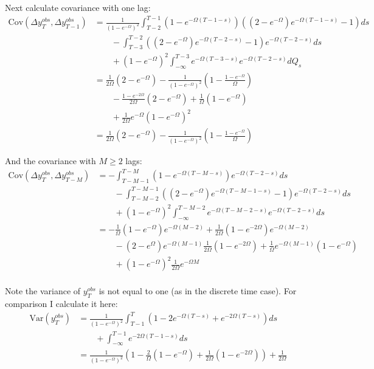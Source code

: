 \documentclass[12pt,pdftex,letterpaper]{article}
\begin{document}
Next calculate covariance with one lag:
\begin{align*}
\mathrm{Cov}(\Delta y_T^{obs},\Delta y_{T-1}^{obs}) 
&=\frac{1}{(1-e^{-\Omega})^2}\int_{T-2}^{T-1}  ( 1 - e^{-\Omega (T-1-s)} ) \left( (2-e^{-\Omega}) e^{-\Omega (T-1-s)} -1  \right) ds \\
 & \qquad - \int_{T-3}^{T-2}\left( (2-e^{-\Omega}) e^{-\Omega (T-2-s)} -1  \right) e^{-\Omega (T-2-s)} ds \\
& \qquad +  (1-e^{-\Omega})^2 \int_{-\infty}^{T-3}  e^{-\Omega (T-3-s)}  e^{-\Omega (T-2-s)} dQ_s \\
&=   \frac{1}{2\Omega}(2-e^{-\Omega}) - \frac{1}{(1-e^{-\Omega})^2}( 1 - \frac{1-e^{-\Omega}}{\Omega}) \\
& \qquad - \frac{1-e^{-2\Omega}}{2\Omega}\left( 2- e^{-\Omega} \right) + \frac{1}{\Omega}(1-e^{-\Omega}) \\
& \qquad +  \frac{1 }{2\Omega} e^{-\Omega}(1-e^{-\Omega})^2 \\
&=   \frac{1}{2\Omega}(2-e^{-\Omega}) - \frac{1}{(1-e^{-\Omega})^2}( 1 - \frac{1-e^{-\Omega}}{\Omega})
\end{align*}





And the covariance with $M \geq 2$ lags: 
\begin{align*}
\mathrm{Cov}(\Delta y_T^{obs},\Delta y_{T-M}^{obs}) 
&=-\int_{T-M-1}^{T-M}  ( 1 - e^{-\Omega (T-M-s)} ) e^{-\Omega (T-2-s)} ds \\ 
& \qquad - \int_{T-M-2}^{T-M-1}\left( (2-e^{-\Omega}) e^{-\Omega (T-M-1-s)} -1  \right)e^{-\Omega (T-2-s)} ds \\
& \qquad +  (1-e^{-\Omega})^2 \int_{-\infty}^{T-M-2}  e^{-\Omega (T-M-2-s)} e^{-\Omega (T-2-s)} ds \\
&= -\frac{1}{\Omega}(1-e^{-\Omega})e^{-\Omega (M-2)} +\frac{1}{2\Omega}(1-e^{-2\Omega})e^{-\Omega (M-2)} \\
& \qquad - (2-e^{\Omega}) e^{-\Omega(M-1)}\frac{1}{2\Omega}(1-e^{-2\Omega}) + \frac{1}{\Omega} e^{-\Omega(M-1)} (1-e^{-\Omega})\\
& \qquad +(1-e^{-\Omega})^2 \frac{1}{2\Omega} e^{-\Omega M} \\
\end{align*}


Note the variance of $y_T^{obs}$ is not equal to one (as in the discrete time case). For comparison I calculate it here:
\begin{align*}
\mathrm{Var}( y_T^{obs}) &= \frac{1}{(1-e^{-\Omega})^2}\int_{T-1}^{T} ( 1 - 2e^{-\Omega (T-s)}  + e^{-2\Omega (T-s)}) ds \\
& \qquad +  \int_{-\infty}^{T-1}  e^{-2\Omega (T-1-s)} ds \\
&= \frac{1}{(1-e^{-\Omega})^2}\left( 1 - \frac{2}{\Omega}(1-e^{-\Omega})    + \frac{1}{2\Omega}(1-e^{-2\Omega}) \right) +  \frac{1}{2\Omega}
\end{align*}
\end{document}
